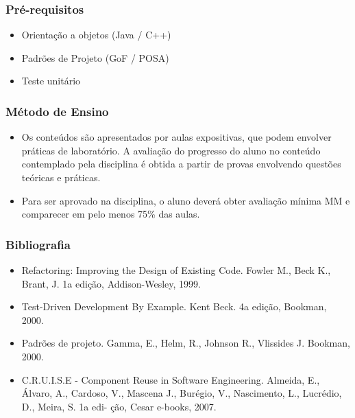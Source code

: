 \documentclass{beamer}
\begin{document}
		\begin{frame}
		\frametitle{Pré-requisitos}
		\begin{itemize}
			\item Orientação a objetos (Java / C++)
			\item Padrões de Projeto (GoF / POSA)
			\item Teste unitário
		\end{itemize}
	\end{frame}

		\begin{frame}
		\frametitle{Método de Ensino}
		\begin{itemize}
			\item 	Os conteúdos são apresentados por aulas expositivas, que podem envolver práticas de laboratório.
A avaliação do progresso do aluno no conteúdo contemplado pela disciplina é obtida a partir de 
provas envolvendo questões teóricas e práticas.

			\item Para ser aprovado na disciplina, o aluno deverá obter avaliação mínima MM e comparecer em pelo 
menos 75\% das aulas.

		\end{itemize}
	\end{frame}
	
	\begin{frame}
	\frametitle{Bibliografia}
\begin{itemize}
	\item Refactoring: Improving the Design of Existing Code. Fowler M., Beck K., Brant, J. 1a
edição, Addison-Wesley, 1999.
	\item Test-Driven Development By Example. Kent Beck. 4a edição, Bookman, 2000.
	\item Padrões de projeto. Gamma, E., Helm, R., Johnson R., Vlissides J. Bookman, 2000.
	\item C.R.U.I.S.E - Component Reuse in Software Engineering. Almeida, E., Álvaro, A.,
Cardoso, V., Mascena J., Burégio, V., Nascimento, L., Lucrédio, D., Meira, S. 1a edi-
ção, Cesar e-books, 2007.

\end{itemize}
\end{frame}
\end{document}
